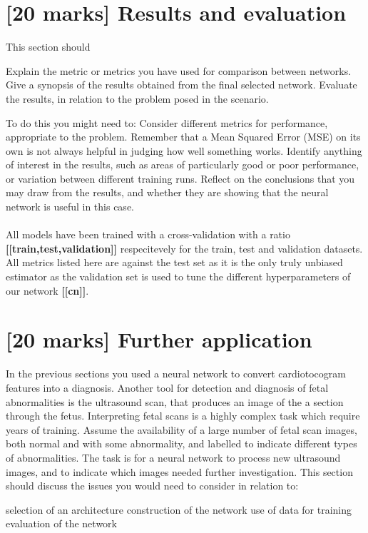 \documentclass[11pt,a4paper]{article}
\begin{document}
\section{[20 marks] Results and evaluation}
This section should
\begin{outline}
  \1 Explain the metric or metrics you have used for comparison between networks.
  \1 Give a synopsis of the results obtained from the final selected network.
  \1 Evaluate the results, in relation to the problem posed in the scenario. 
\end{outline}
\begin{outline}
To do this you might need to:
  \1 Consider different metrics for performance, appropriate to the problem. Remember that a Mean Squared Error (MSE) on its own is not always helpful in judging how well something works.
  \1 Identify anything of interest in the results, such as areas of particularly good or poor performance, or variation between different training runs.
  \1 Reflect on the conclusions that you may draw from the results, and whether they are showing that the neural network is useful in this case.
\end{outline}

\paragraph{}
All models have been trained with a cross-validation with a ratio \textbf{[[train,test,validation]]} respecitevely for the train, test and validation datasets. All metrics listed here are against the test set as it is the only truly unbiased estimator as the validation set is used to tune the different hyperparameters of our network \textbf{[[cn]]}. 



\section{[20 marks] Further application}
In the previous sections you used a neural network to convert cardiotocogram features into a diagnosis. Another tool for detection and diagnosis of fetal abnormalities is the ultrasound scan, that produces an image of the a section through the fetus. Interpreting fetal scans is a highly complex task which require years of training. Assume the availability of a large number of fetal scan images, both normal and with some abnormality, and labelled to indicate different types of abnormalities. The task is for a neural network to process new ultrasound images, and to indicate which images needed further investigation. This section should discuss the issues you would need to consider in relation to:
\begin{outline}
  \1 selection of an architecture
  \1 construction of the network
  \1 use of data for training
  \1 evaluation of the network
\end{outline}
\end{document}
